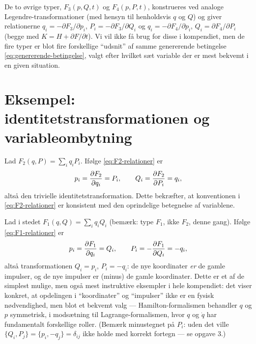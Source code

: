 \begin{bemaerkning}
De to øvrige typer, $F_3(p,Q,t)$ og $F_4(p,P,t)$, konstrueres ved
analoge Legendre-transformationer (med hensyn til henholdsvis $q$ og
$Q$) og giver relationerne
$q_i=-\partial F_3/\partial p_i$, $P_i=-\partial F_3/\partial Q_i$
og $q_i=-\partial F_4/\partial p_i$, $Q_i=\partial F_4/\partial P_i$
(begge med $K=H+\partial F/\partial t$). Vi vil ikke få brug for disse
i kompendiet, men de fire typer er blot fire forskellige ``udsnit'' af
samme genererende betingelse \eqref{eq:genererende-betingelse}, valgt
efter hvilket sæt variable der er mest bekvemt i en given situation.
\end{bemaerkning}

\section{Eksempel: identitetstransformationen og variableombytning}

\begin{eksempel}
Lad $F_2(q,P) = \sum_i q_iP_i$. Ifølge \eqref{eq:F2-relationer} er
\begin{equation}
  p_i = \pdv{F_2}{q_i} = P_i, \qquad Q_i = \pdv{F_2}{P_i} = q_i,
\end{equation}
altså den trivielle identitetstransformation. Dette bekræfter, at
konventionen i \eqref{eq:F2-relationer} er konsistent med den
oprindelige betegnelse af variablene.
\end{eksempel}

\begin{eksempel}
Lad i stedet $F_1(q,Q) = \sum_i q_iQ_i$ (bemærk: type $F_1$, ikke
$F_2$, denne gang). Ifølge \eqref{eq:F1-relationer} er
\begin{equation}
  p_i = \pdv{F_1}{q_i} = Q_i, \qquad P_i = -\pdv{F_1}{Q_i} = -q_i,
\end{equation}
altså transformationen $Q_i=p_i$, $P_i=-q_i$: de nye koordinater
\emph{er} de gamle impulser, og de nye impulser er (minus) de gamle
koordinater. Dette er et af de simplest mulige, men også mest
instruktive eksempler i hele kompendiet: det viser konkret, at
opdelingen i ``koordinater'' og ``impulser'' ikke er en fysisk nødvendighed,
men blot et bekvemt valg — Hamilton-formalismen behandler $q$ og $p$
symmetrisk, i modsætning til Lagrange-formalismen, hvor $q$ og
$\dot q$ har fundamentalt forskellige roller. (Bemærk minustegnet
på $P_i$: uden det ville $\{Q_i,P_j\}=\{p_i,-q_j\}=\delta_{ij}$ ikke
holde med korrekt fortegn — se opgave 3.)
\end{eksempel}

